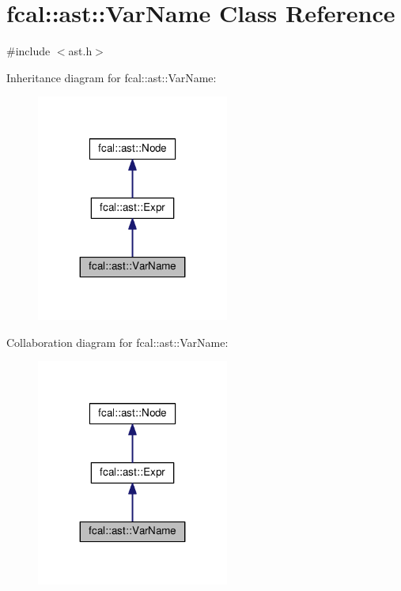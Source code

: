 \hypertarget{classfcal_1_1ast_1_1VarName}{}\section{fcal\+:\+:ast\+:\+:Var\+Name Class Reference}
\label{classfcal_1_1ast_1_1VarName}


{\ttfamily \#include $<$ast.\+h$>$}



Inheritance diagram for fcal\+:\+:ast\+:\+:Var\+Name\+:
\nopagebreak
\begin{figure}[H]
\begin{center}
\leavevmode
\includegraphics[width=179pt]{classfcal_1_1ast_1_1VarName__inherit__graph}
\end{center}
\end{figure}


Collaboration diagram for fcal\+:\+:ast\+:\+:Var\+Name\+:
\nopagebreak
\begin{figure}[H]
\begin{center}
\leavevmode
\includegraphics[width=179pt]{classfcal_1_1ast_1_1VarName__coll__graph}
\end{center}
\end{figure}
